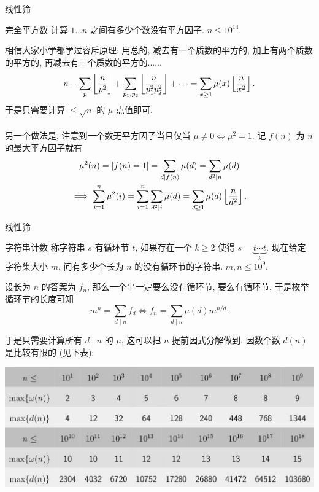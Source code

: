 \documentclass{beamer}
\newcommand{\nl}{\\\hspace*{\fill}\\}
\begin{document}
    \begin{frame}{线性筛}
        \begin{block}{完全平方数}
            计算 $1\dots n$ 之间有多少个数没有平方因子. $n\leq 10^{14}$.
        \end{block}
        \pause
        相信大家小学都学过容斥原理: 用总的, 减去有一个质数的平方的, 加上有两个质数的平方的, 再减去有三个质数的平方的......
        $$
        n-\sum_p\left\lfloor n\over p^2\right\rfloor+\sum_{p_1,p_2}\left\lfloor n\over p_1^2p_2^2\right\rfloor+\cdots=\sum_{x\geq 1}\mu(x)\left\lfloor n\over x^2\right\rfloor.
        $$
        于是只需要计算 $\leq\sqrt n$ 的 $\mu$ 点值即可.\nl
        \pause
        另一个做法是, 注意到一个数无平方因子当且仅当 $\mu\neq 0\iff\mu^2=1$. 记 $f(n)$ 为 $n$ 的最大平方因子就有
        \begin{gather*}
            \mu^2(n)=[f(n)=1]=\sum_{d\mid f(n)}\mu(d)=\sum_{d^2\mid n}\mu(d)\\
            \implies\sum_{i=1}^n\mu^2(i)=\sum_{i=1}^n\sum_{d^2\mid i}\mu(d)=\sum_{d\geq 1}\mu(d)\left\lfloor n\over d^2\right\rfloor.
        \end{gather*}
    \end{frame}

    \begin{frame}{线性筛}
        \begin{block}{字符串计数}
            称字符串 $s$ 有循环节 $t$, 如果存在一个 $k\geq 2$ 使得 $s=\underbrace{t\cdots t}_k$. 现在给定字符集大小 $m$, 问有多少个长为 $n$ 的没有循环节的字符串. $m,n\leq 10^9$.
        \end{block}
        \pause
        设长为 $n$ 的答案为 $f_n$, 那么一个串一定要么没有循环节, 要么有循环节, 于是枚举循环节的长度可知
        $$
        m^n=\sum_{d\mid n}f_d\iff f_n=\sum_{d\mid n}\mu(d)m^{n/d}.
        $$

        于是只需要计算所有 $d\mid n$ 的 $\mu$, 这可以把 $n$ 提前因式分解做到. 因数个数 $d(n)$ 是比较有限的 (见下表):\\
        \begin{center}
            \includegraphics[scale=0.5]{images/fig1.jpg}\\
        \end{center}
    \end{frame}
\end{document}
